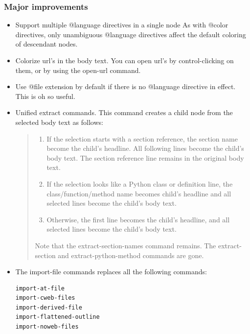 \documentclass[a4paper,10pt,english]{sphinxmanual}
\begin{document}
\subsubsection{Major improvements}
\label{what-is-new:major-improvements}\begin{itemize}
\item {} 
Support multiple @language directives in a single node
As with @color directives, only unambiguous @language directives affect the
default coloring of descendant nodes.

\item {} 
Colorize url's in the body text. You can open url's by control-clicking on
them, or by using the open-url command.

\item {} 
Use @file extension by default if there is no @language directive in effect.
This is oh so useful.

\item {} 
Unified extract commands.  This command creates a child node from the selected
body text as follows:
\begin{quote}
\begin{enumerate}
\item {} 
If the selection starts with a section reference, the section name become the
child's headline. All following lines become the child's body text. The
section reference line remains in the original body text.

\item {} 
If the selection looks like a Python class or definition line, the
class/function/method name becomes child's headline and all selected lines
become the child's body text.

\item {} 
Otherwise, the first line becomes the child's headline, and all selected
lines become the child's body text.

\end{enumerate}

Note that the extract-section-names command remains.
The extract-section and extract-python-method commands are gone.
\end{quote}

\item {} 
The import-file commands replaces all the following commands:

\begin{Verbatim}[commandchars=\\\{\}]
import-at-file
import-cweb-files
import-derived-file
import-flattened-outline
import-noweb-files
\end{Verbatim}


\end{itemize}
\end{document}
